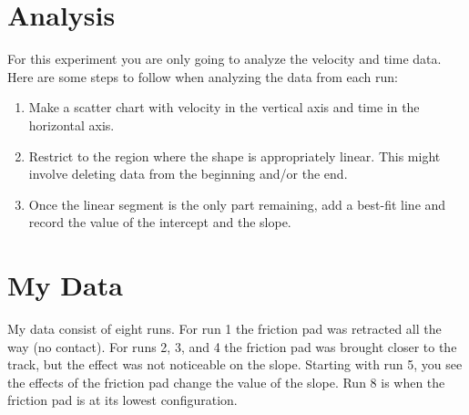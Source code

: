 \section{Analysis}
%
For this experiment you are only going to analyze the velocity and time data. Here are some steps to follow when analyzing the data from each run:
\begin{enumerate}
    \item Make a scatter chart with velocity in the vertical axis and time in the horizontal axis.
    \item Restrict to the region where the shape is appropriately linear. This might involve deleting data from the beginning and/or the end.
    \item Once the linear segment is the only part remaining, add a best-fit line and record the value of the intercept and the slope.
\end{enumerate}
%
\section{My Data}
%
My data consist of eight runs. For run 1 the friction pad was retracted all the way (no contact). For runs 2, 3, and 4 the friction pad was brought closer to the track, but the effect was not noticeable on the slope. Starting with run 5, you see the effects of the friction pad change the value of the slope. Run 8 is when the friction pad is at its lowest configuration.
%
